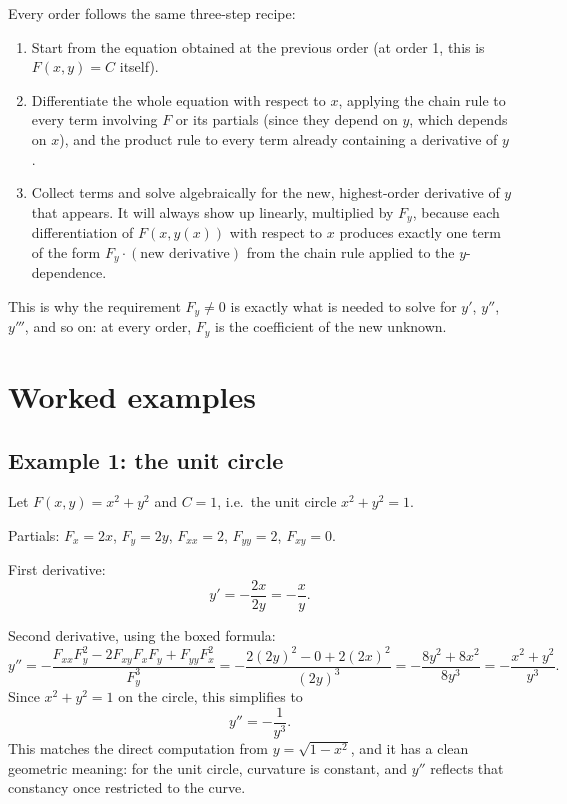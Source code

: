 \documentclass{essay}
\begin{document}
Every order follows the same three-step recipe:
\begin{enumerate}[label=(\arabic*)]
  \item Start from the equation obtained at the previous order (at order 1, this is
    $F(x,y) = C$ itself).
  \item Differentiate the whole equation with respect to $x$, applying the chain rule to every
    term involving $F$ or its partials (since they depend on $y$, which depends on $x$), and the
    product rule to every term already containing a derivative of $y$.
  \item Collect terms and solve algebraically for the new, highest-order derivative of $y$
    that appears. It will always show up linearly, multiplied by $F_y$, because each
    differentiation of $F(x, y(x))$ with respect to $x$ produces exactly one term of the form
    $F_y \cdot (\text{new derivative})$ from the chain rule applied to the $y$-dependence.
\end{enumerate}
This is why the requirement $F_y \neq 0$ is exactly what is needed to solve for $y'$, $y''$,
$y'''$, and so on: at every order, $F_y$ is the coefficient of the new unknown.

\section{Worked examples}

\subsection*{Example 1: the unit circle}

Let $F(x,y) = x^2 + y^2$ and $C = 1$, i.e.\ the unit circle $x^2 + y^2 = 1$.

Partials: $F_x = 2x$, $F_y = 2y$, $F_{xx} = 2$, $F_{yy} = 2$, $F_{xy} = 0$.

First derivative:
\[
  y' = -\frac{2x}{2y} = -\frac{x}{y}.
\]

Second derivative, using the boxed formula:
\[
  y'' = -\frac{F_{xx}F_y^2 - 2F_{xy}F_xF_y + F_{yy}F_x^2}{F_y^3}
  = -\frac{2(2y)^2 - 0 + 2(2x)^2}{(2y)^3}
  = -\frac{8y^2 + 8x^2}{8y^3}
  = -\frac{x^2+y^2}{y^3}.
\]
Since $x^2 + y^2 = 1$ on the circle, this simplifies to
\[
  y'' = -\frac{1}{y^3}.
\]
This matches the direct computation from $y = \sqrt{1-x^2}$, and it has a clean geometric
meaning: for the unit circle, curvature is constant, and $y''$ reflects that constancy once
restricted to the curve.
\end{document}
